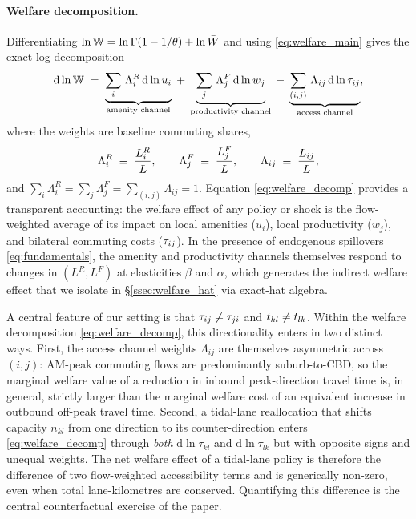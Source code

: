 \paragraph{Welfare decomposition.}
Differentiating $\ln\mathbb W=\ln\Gamma(1-1/\theta)+\ln\bar W$ and
using \eqref{eq:welfare_main} gives the exact log-decomposition
\begin{equation}
  \mathrm d\ln\mathbb W
  \;=\;
  \underbrace{\sum_i\,\Lambda_i^{R}\,\mathrm d\ln u_i}_{\text{amenity channel}}
  \;+\;
  \underbrace{\sum_j\,\Lambda_j^{F}\,\mathrm d\ln w_j}_{\text{productivity channel}}
  \;-\;
  \underbrace{\sum_{(i,j)}\,\Lambda_{ij}\,\mathrm d\ln\tau_{ij}}_{\text{access channel}},
  \label{eq:welfare_decomp}
\end{equation}
where the weights are baseline commuting shares,
\begin{equation}
  \Lambda_i^{R}\;\equiv\;\frac{L_i^R}{\bar L},
  \qquad
  \Lambda_j^{F}\;\equiv\;\frac{L_j^F}{\bar L},
  \qquad
  \Lambda_{ij}\;\equiv\;\frac{L_{ij}}{\bar L},
  \label{eq:lambda_weights}
\end{equation}
and $\sum_i\Lambda_i^R=\sum_j\Lambda_j^F=\sum_{(i,j)}\Lambda_{ij}=1$.
Equation \eqref{eq:welfare_decomp} provides a transparent
accounting: the welfare effect of any policy or shock is the
flow-weighted average of its impact on local amenities ($u_i$), local
productivity ($w_j$), and bilateral commuting costs ($\tau_{ij}$).  In
the presence of endogenous spillovers \eqref{eq:fundamentals}, the
amenity and productivity channels themselves respond to changes in
$(L^R,L^F)$ at elasticities $\beta$ and $\alpha$, which generates the
indirect welfare effect that we isolate in
\S\ref{ssec:welfare_hat} via exact-hat algebra.

\begin{remark}\label{rem:directional_welfare}
A central feature of our setting is that $\tau_{ij}\ne\tau_{ji}$ and
$t_{kl}\ne t_{lk}$.  Within the welfare decomposition
\eqref{eq:welfare_decomp}, this directionality enters in two distinct
ways.  First, the access channel weights $\Lambda_{ij}$ are themselves
asymmetric across $(i,j)$: AM-peak commuting flows are
predominantly suburb-to-CBD, so the marginal welfare value of a
reduction in inbound peak-direction travel time is, in general,
strictly larger than the marginal welfare cost of an equivalent
increase in outbound off-peak travel time.  Second, a tidal-lane
reallocation that shifts capacity $n_{kl}$ from one direction to its
counter-direction enters \eqref{eq:welfare_decomp} through
\emph{both} $\mathrm d\ln\tau_{kl}$ and $\mathrm d\ln\tau_{lk}$ but
with opposite signs and unequal weights.  The net welfare effect of
a tidal-lane policy is therefore the difference of two flow-weighted
accessibility terms and is generically non-zero, even when total
lane-kilometres are conserved.  Quantifying this difference is the
central counterfactual exercise of the paper.
\end{remark}

